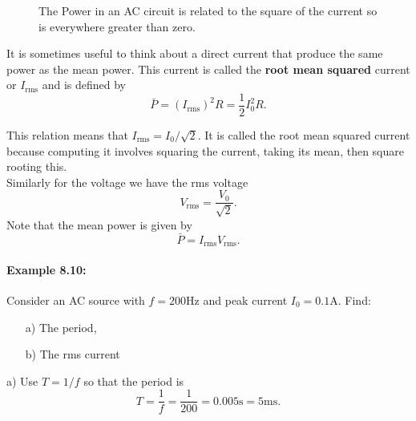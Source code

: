 \documentclass[a4paper,12pt]{book}
\begin{document}
\begin{figure}[ht]
    \centering
    \caption{The Power in an AC circuit is related to the square of the current so is everywhere greater than zero.}
        \label{fig: AC Power}
\end{figure}

It is sometimes useful to think about a direct current that produce the same power as the mean power. This current is called the \textbf{root mean squared} current or $I_{\text{rms}}$ and is defined by 
\begin{equation*}
\bar{P}=(I_{\text{rms}})^{2}R=\frac{1}{2}I_{0}^{2}R.
\end{equation*}

This relation means that $I_{\text{rms}}=I_{0}/\sqrt{2}$. It is called the root mean squared current because computing it involves squaring the current, taking its mean, then square rooting this.\\

Similarly for the voltage we have the rms voltage
\begin{equation*}
V_{\text{rms}}=\frac{V_{0}}{\sqrt{2}}.
\end{equation*}
Note that the mean power is given by
\begin{equation*}
\bar{P}=I_{\text{rms}}V_{\text{rms}}.
\end{equation*}

\paragraph{Example 8.10:} Consider an AC source with $f=200\text{Hz}$ and peak current $I_{0}=0.1\text{A}$. Find:
\begin{itemize}
\setlength{\itemsep}{-5pt}
    \item[a)] The period,
    \item[b)] The rms current
\end{itemize}  

a) Use $T=1/f$ so that the period is
\begin{equation*}
T=\frac{1}{f}=\frac{1}{200}=0.005\text{s}=5\text{ms}.
\end{equation*}
\end{document}
